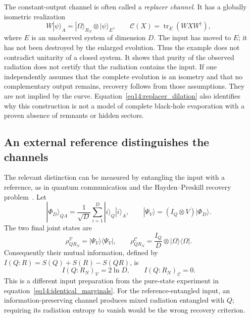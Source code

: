 \documentclass[11pt,letterpaper]{article}
\theoremstyle{plain}
\theoremstyle{definition}
\theoremstyle{remark}
\newcommand{\Ccal}{\mathcal{C}}
\newcommand{\Vcal}{\mathcal{V}}
\DeclareMathOperator{\tr}{tr}
\begin{document}
The constant-output channel is often called a \emph{replacer channel}.
It has a globally isometric realization
\begin{equation}
 W|\psi\rangle_A
 =|\Omega\rangle_{R_N}\otimes|\psi\rangle_E,
 \qquad \Ccal(X)=\tr_E(WXW^\dagger),
 \label{eq14:replacer_dilation}
\end{equation}
where $E$ is an unobserved system of dimension $D$. The input has moved
to $E$; it has not been destroyed by the enlarged evolution. Thus the
example does not contradict unitarity of a closed system. It shows
that purity of the observed radiation does not certify that the
radiation contains the input. If one independently assumes that the
complete evolution is an isometry and that no complementary output
remains, recovery follows from those assumptions. They are not implied
by the curve. Equation~\eqref{eq14:replacer_dilation} also identifies
why this construction is not a model of complete black-hole
evaporation with a proven absence of remnants or hidden sectors.

\subsection{An external reference distinguishes the channels}
\label{subsec14:reference_test}

The relevant distinction can be measured by entangling the input with
a reference, as in quantum communication and the Hayden--Preskill
recovery problem~\citep{schumacher1996,haydenpreskill2007}. Let
\begin{equation}
 |\Phi_D\rangle_{QA}=\frac1{\sqrt D}
 \sum_{i=1}^{D}|i\rangle_Q|i\rangle_A,
 \qquad |\Psi_V\rangle=(I_Q\otimes V)|\Phi_D\rangle.
 \label{eq14:reference_input}
\end{equation}
The two final joint states are
\begin{equation}
 \rho_{QR_N}^{\Vcal}=|\Psi_V\rangle\langle\Psi_V|,
 \qquad
 \rho_{QR_N}^{\Ccal}=\frac{I_Q}{D}\otimes
 |\Omega\rangle\langle\Omega|.
 \label{eq14:reference_outputs}
\end{equation}
Consequently their mutual information, defined by
$I(Q:R)=S(Q)+S(R)-S(QR)$, is
\begin{equation}
 I(Q:R_N)_{\Vcal}=2\ln D,
 \qquad I(Q:R_N)_{\Ccal}=0.
 \label{eq14:reference_mutual_information}
\end{equation}
This is a different input preparation from the pure-state experiment
in equation~\eqref{eq14:identical_marginals}. For the reference-entangled
input, an information-preserving channel produces mixed radiation
entangled with $Q$; requiring its radiation entropy to vanish would
be the wrong recovery criterion.
\end{document}
